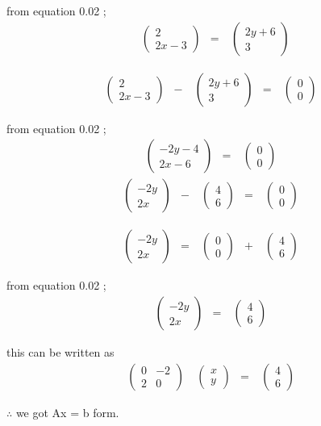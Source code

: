 \documentclass[journal,12pt,twocolumn]{IEEEtran}
\theoremstyle{remark}
\newcommand{\myvec}[1]{\ensuremath{\begin{pmatrix}#1\end{pmatrix}}}
\numberwithin{equation}{subsection}
\begin{document}
       from equation 0.02 ;
     \begin{align}
      &\ \myvec{2\\2x-3 }&=
&\ \myvec{2y+6\\3}
\end{align} 
      
     \begin{align}
&\ \myvec{2\\2x-3 }&-
&\ \myvec{2y+6\\3} &= 
&\ \myvec{0\\0} &
\end{align} 
      
       from equation 0.02 ;
     \begin{align}
&\ \myvec{-2y-4\\2x-6 } &=
&\ \myvec{0\\0} & 
\end{align} 
     \begin{align}
&\ \myvec{-2y\\2x }&-
&\ \myvec{4\\6} &= 
&\ \myvec{0\\0} &
\end{align} 
    
     \begin{align}
&\ \myvec{-2y\\2x }&=
&\ \myvec{0\\0} &+ 
&\ \myvec{4\\6} &
\end{align} 

       from equation 0.02 ;
     \begin{align}
&\ \myvec{-2y\\2x }&=
&\ \myvec{4\\6} & 
\end{align} 

      this can be written as 
     \begin{align}
&\ \myvec{0 & -2\\2 & 0}&
\ \myvec{x\\y}&=
&\ \myvec{4\\6} & 
\end{align} 

     $\therefore$ we got Ax = b form.  
\end{document}
